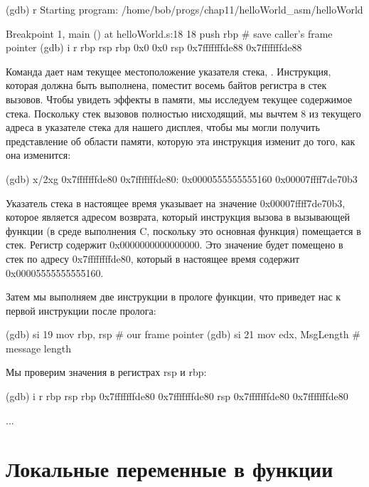 \begin{ffcode}
    (gdb) r
    Starting program: /home/bob/progs/chap11/helloWorld_asm/helloWorld

    Breakpoint 1, main () at helloWorld.s:18
    18  push  rbp  # save caller's frame pointer
    (gdb) i r rbp rsp
    rbp  0x0  0x0
    rsp  0x7fffffffde88  0x7fffffffde88
\end{ffcode}

Команда  дает нам текущее местоположение указателя стека, . Инструкция, которая должна быть выполнена, поместит восемь байтов регистра  в стек вызовов. Чтобы увидеть эффекты в памяти, мы исследуем текущее содержимое стека. Поскольку стек вызовов полностью нисходящий, мы вычтем 8 из текущего адреса в указателе стека для нашего дисплея, чтобы мы могли получить представление об области памяти, которую эта инструкция изменит до того, как она изменится:

\begin{ffcode}
    (gdb) x/2xg 0x7fffffffde80
    0x7fffffffde80: 0x0000555555555160  0x00007ffff7de70b3
\end{ffcode}

Указатель стека в настоящее время указывает на значение 0x00007ffff7de70b3, которое является адресом возврата, который инструкция вызова в вызывающей функции (в среде выполнения C, поскольку это основная функция) помещается в стек. Регистр  содержит 0x0000000000000000. Это значение будет помещено в стек по адресу 0x7ffffffffde80, который в настоящее время содержит 0x00005555555555160.

Затем мы выполняем две инструкции в прологе функции, что приведет нас к первой инструкции после пролога:

\begin{ffcode}
    (gdb) si
    19  mov  rbp, rsp  # our frame pointer
    (gdb) si
    21  mov  edx, MsgLength  # message length
\end{ffcode}

Мы проверим значения в регистрах rsp и rbp:

\begin{ffcode}
    (gdb) i r rbp rsp
    rbp  0x7fffffffde80  0x7fffffffde80
    rsp  0x7fffffffde80  0x7fffffffde80
\end{ffcode}

...

\section{Локальные переменные в функции}

